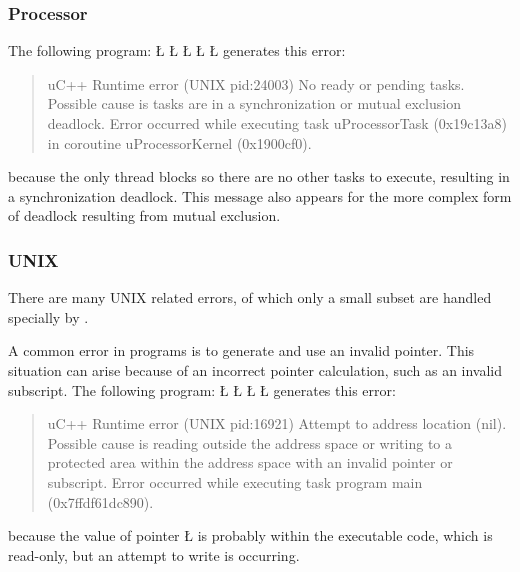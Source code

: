 \documentclass[openright,twoside]{report}
\begin{document}
\subsubsection{Processor}

The following program:
\LGinlinefalse\LGbegin\lgrinde
\L{}
\L{}
\L{\LB{}}
\L{\LB{}}
\CE{}\L{\LB{\}}}
\endlgrinde\LGend
generates this error:
\begin{quote}
\BGfont
uC++ Runtime error (UNIX pid:24003) No ready or pending tasks.
Possible cause is tasks are in a synchronization or mutual exclusion deadlock.
Error occurred while executing task uProcessorTask (0x19c13a8) in coroutine uProcessorKernel (0x1900cf0).
\end{quote}
because the only thread blocks so there are no other tasks to execute, resulting in a synchronization deadlock.
This message also appears for the more complex form of deadlock resulting from mutual exclusion.


\subsubsection{UNIX}

There are many UNIX related errors, of which only a small subset are handled specially by \uC.

A common error in \CC programs is to generate and use an invalid pointer.
This situation can arise because of an incorrect pointer calculation, such as an invalid subscript.
The following program:
\LGinlinefalse\LGbegin\lgrinde
\L{}
\L{\LB{}}
\CE{}\L{\LB{}}
\CE{}\L{\LB{\}}}
\endlgrinde\LGend
generates this error:
\begin{quote}
\BGfont
uC++ Runtime error (UNIX pid:16921) Attempt to address location (nil).
Possible cause is reading outside the address space or writing to a protected area within the address space with an invalid pointer or subscript.
Error occurred while executing task program main (0x7ffdf61dc890).
\end{quote}
because the value of pointer \LGinlinetrue\LGbegin\lgrinde\L{}\endlgrinde\LGend{} is probably within the executable code, which is read-only, but an attempt to write is occurring.
\end{document}
